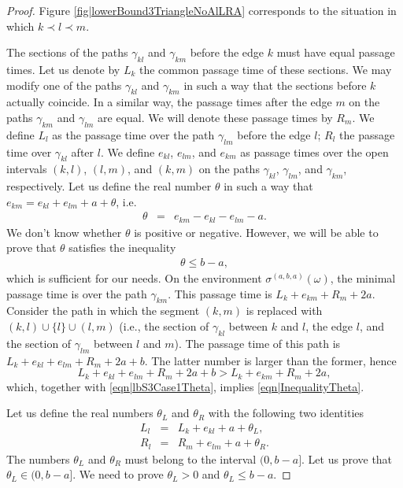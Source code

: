 \documentclass[10pt,a4paper]{amsart}
\begin{document}
\begin{proof}
 Figure \ref{fig|lowerBound3TriangleNoAlLRA} corresponds to the situation in which $k\prec l\prec m$. 
 
The sections of the paths $\gamma_{kl}$ and $\gamma_{km}$ before the edge $k$ must have equal passage times. Let us denote by $L_k$ the common passage time of these sections. We may modify one of the paths $\gamma_{kl}$ and $\gamma_{km}$ in such a way that the sections before $k$ actually coincide. In a similar way, the passage times after the edge $m$ on the paths $\gamma_{km}$ and $\gamma_{lm}$ are equal. We will denote these passage times by $R_m$. We define $L_l$ as the passage time over the path $\gamma_{lm}$ before the edge $l$; $R_l$ the passage time over $\gamma_{kl}$ after $l$. We define $e_{kl}$, $e_{lm}$, and $e_{km}$ as passage times over the open intervals $(k,l)$, $(l,m)$, and $(k,m)$ on the paths 
$\gamma_{kl}$, $\gamma_{lm}$, and $\gamma_{km}$, respectively. Let us define the real number $\theta$ in such a way that $e_{km} =e_{kl}+e_{lm}+a+\theta$, i.e.
\begin{eqnarray} \theta &=&
e_{km} -e_{kl}-e_{lm}-a
 .\label{eqn|lbS3Case1Theta}\end{eqnarray} 
We don't know whether $\theta$ is positive or negative. However, we will
be able to prove that $\theta$ satisfies the inequality 
\begin{eqnarray}\theta\leq b-a,\label{eqn|InequalityTheta}\end{eqnarray}
which is sufficient for our needs. 
On the environment $\sigma^{(a,b,a)}(\omega)$, the minimal passage time is over the path $\gamma_{km}$. This passage time is $L_k+e_{km}+R_m+2a$. 
Consider the path in which the segment $(k,m)$ is replaced with $(k,l)\cup \{l\}\cup (l,m)$ (i.e., the section of $\gamma_{kl}$ between $k$ and $l$, the edge $l$, and 
the section of $\gamma_{lm}$ between $l$ and $m$). The passage time of this path is 
$L_k+e_{kl}+e_{lm}+R_m+2a+b$. The latter number is larger than the former, hence 
\[L_k+e_{kl}+e_{lm}+R_m+2a+b>L_k+e_{km}+R_m+2a,\]
which, together with \eqref{eqn|lbS3Case1Theta}, implies \eqref{eqn|InequalityTheta}.

Let us define the real numbers $\theta_L$ and $\theta_R$ with the following two identities
\begin{eqnarray}
L_l&=&L_k+e_{kl}+a+\theta_L,\label{eqn|lbS3Case1ThetaL}\\
R_l&=&R_m+e_{lm}+a+\theta_R.\label{eqn|lbS3Case1ThetaR}
\end{eqnarray}
The numbers $\theta_L$ and $\theta_R$ must belong to the interval $(0,b-a]$. Let us prove that $\theta_L\in(0,b-a]$. We need to prove $\theta_L>0$ and $\theta_L\leq b-a$. 


\end{proof}
\end{document}
